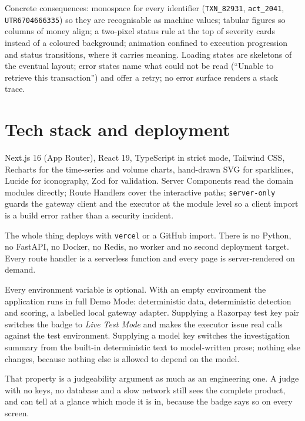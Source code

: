 \documentclass[10pt,twocolumn,a4paper]{article}
\newcommand{\code}[1]{\texttt{\small #1}}
\begin{document}
Concrete consequences: monospace for every identifier (\code{TXN\_82931},
\code{act\_2041}, \code{UTR6704666335}) so they are recognisable as machine
values; tabular figures so columns of money align; a two-pixel status rule at the
top of severity cards instead of a coloured background; animation confined to
execution progression and status transitions, where it carries meaning. Loading
states are skeletons of the eventual layout; error states name what could not be
read (``Unable to retrieve this transaction'') and offer a retry; no error
surface renders a stack trace.

\section{Tech stack and deployment}

Next.js 16 (App Router), React 19, TypeScript in strict mode, Tailwind CSS,
Recharts for the time-series and volume charts, hand-drawn SVG for sparklines,
Lucide for iconography, Zod for validation. Server Components read the domain
modules directly; Route Handlers cover the interactive paths; \code{server-only}
guards the gateway client and the executor at the module level so a client import
is a build error rather than a security incident.

The whole thing deploys with \code{vercel} or a GitHub import. There is no
Python, no FastAPI, no Docker, no Redis, no worker and no second deployment
target. Every route handler is a serverless function and every page is
server-rendered on demand.

Every environment variable is optional. With an empty environment the application
runs in full Demo Mode: deterministic data, deterministic detection and scoring,
a labelled local gateway adapter. Supplying a Razorpay test key pair switches the
badge to \emph{Live Test Mode} and makes the executor issue real calls against
the test environment. Supplying a model key switches the investigation summary
from the built-in deterministic text to model-written prose; nothing else
changes, because nothing else is allowed to depend on the model.

That property is a judgeability argument as much as an engineering one. A judge
with no keys, no database and a slow network still sees the complete product, and
can tell at a glance which mode it is in, because the badge says so on every
screen.

\end{document}
